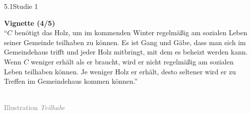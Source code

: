 \documentclass[xcolor=table,9pt,aspectratio=169]{beamer}
\begin{document}
\begin{frame}{\vspace*{10mm}5.1\hspace*{1em}Studie 1}
\begin{multicols}{2}
   \textbf{Vignette (4/5)}\\
   \medskip
   \enquote{$C$ benötigt das Holz, um im kommenden Winter regelmäßig am sozialen Leben seiner Gemeinde teilhaben zu können. Es ist Gang und Gäbe, dass man sich im Gemeindehaus trifft und jeder Holz mitbringt, mit dem es beheizt werden kann. Wenn $C$ weniger erhält als er braucht, wird er nicht regelmäßig am sozialen Leben teilhaben können. Je weniger Holz er erhält, desto seltener wird er zu Treffen im Gemeindehaus kommen können.}
   \vfill
   \begin{center}
      \\
      \textcolor{gray}{Illustration \textit{Teilhabe}}
   \end{center}
\end{multicols}
\end{frame}
\end{document}
